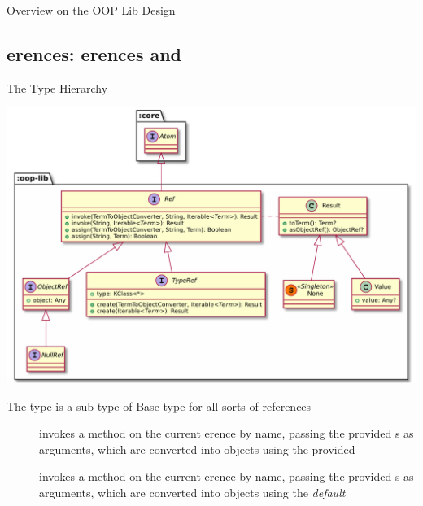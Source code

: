 \documentclass[handout]{beamer}
\begin{document}
\begin{frame}[allowframebreaks]{Overview on the OOP Lib Design}





\end{frame}

\subsection{erences: erences and }

\begin{frame}[allowframebreaks]{The  Type Hierarchy}

    \begin{center}
        \includegraphics[width=.8\linewidth]{./img/full-refs.pdf}
    \end{center}

    \framebreak

    \begin{block}{The  type is a sub-type of }
        \centering
        Base type for all sorts of references
    \end{block}
    \begin{description}
        \item[] invokes a \alert{method} on the current erence by name, passing the provided s as arguments, which are converted into objects using the provided 

        \item[] invokes a \alert{method} on the current erence by name, passing the provided s as arguments, which are converted into objects using the \emph{default} 
        

\end{description}
\end{frame}
\end{document}
